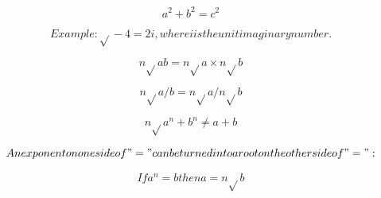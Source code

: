 






\[a^{2} + b^{2} = c^{2}\]

\[Example: \sqrt{}-4 = 2i, where i is the unit imaginary number.\]

\[n\sqrt{}ab = n\sqrt{}a \times n\sqrt{}b\]

\[n\sqrt{}a/b = n\sqrt{}a / n\sqrt{}b\]

\[n\sqrt{}a^{n} + b^{n} \ne a + b\]

\[An exponent on one side of "=" can be turned into a root on the other side of "=":\]

\[If a^{n} = b then a = n\sqrt{}b\]

